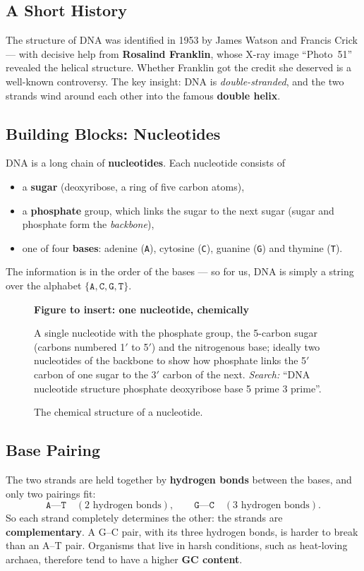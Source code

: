 \documentclass[11pt, oneside]{book}
\newcommand{\seq}[1]{\texttt{#1}}
\newcommand{\figureplaceholder}[5]{%
\begin{figure}[htbp]
\centering
\begin{tcolorbox}[unbreakable,width=\linewidth,height=#1,colback=accent!3,
  colframe=accent!30,boxrule=0.5pt,arc=2.5mm,sharp corners=all,
  valign=center,halign=center,fontupper=\small]
{\bfseries\color{accent}Figure to insert: #2}\par\medskip
{\color{gray!75!black}#3}
\end{tcolorbox}
\caption{#4}\label{#5}
\end{figure}}
\let\originalsubsection\subsection
\renewcommand{\subsection}{\Needspace{6\baselineskip}\originalsubsection}
\begin{document}
\subsection{A Short History}

The structure of DNA was identified in 1953 by James Watson and Francis
Crick --- with decisive help from \textbf{Rosalind Franklin}, whose X-ray
image ``Photo~51'' revealed the helical structure. Whether Franklin got the
credit she deserved is a well-known controversy. The key insight: DNA is
\emph{double-stranded}, and the two strands wind around each other into the
famous \textbf{double helix}.

\subsection{Building Blocks: Nucleotides}

\begin{defbox}[title={DNA (deoxyribonucleic acid)}]
DNA is a long chain of \textbf{nucleotides}. Each nucleotide consists of
\begin{itemize}
  \item a \textbf{sugar} (deoxyribose, a ring of five carbon atoms),
  \item a \textbf{phosphate} group, which links the sugar to the next sugar
    (sugar and phosphate form the \emph{backbone}),
  \item one of four \textbf{bases}: adenine (\seq{A}), cytosine (\seq{C}),
    guanine (\seq{G}) and thymine (\seq{T}).
\end{itemize}
The information is in the order of the bases --- so for us, DNA is simply a
string over the alphabet $\{\seq{A}, \seq{C}, \seq{G}, \seq{T}\}$.
\end{defbox}

\figureplaceholder{4.2cm}{one nucleotide, chemically}%
{A single nucleotide with the phosphate group, the 5-carbon sugar (carbons
numbered 1$'$ to 5$'$) and the nitrogenous base; ideally two nucleotides of the
backbone to show how phosphate links the 5$'$ carbon of one sugar to the 3$'$
carbon of the next. \textit{Search:} ``DNA nucleotide structure phosphate
deoxyribose base 5 prime 3 prime''.}%
{The chemical structure of a nucleotide.}{fig:nucleotide}

\subsection{Base Pairing}

The two strands are held together by \textbf{hydrogen bonds} between the
bases, and only two pairings fit:
\[
  \seq{A} \text{---} \seq{T} \quad (2 \text{ hydrogen bonds}),
  \qquad
  \seq{G} \text{---} \seq{C} \quad (3 \text{ hydrogen bonds}).
\]
So each strand completely determines the other: the strands are
\textbf{complementary}. A G--C pair, with its three hydrogen bonds, is harder
to break than an A--T pair. Organisms that live in harsh conditions, such as
heat-loving archaea, therefore tend to have a higher \textbf{GC content}.
\end{document}
